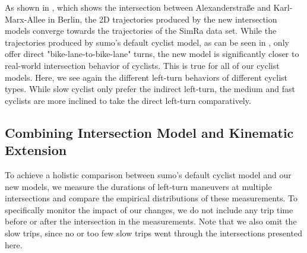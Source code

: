 As shown in , which shows the intersection between Alexanderstraße and Karl-Marx-Allee in Berlin, the 2D trajectories produced by the new intersection models converge towards the trajectories of the SimRa data set.
While the trajectories produced by \ac{sumo}'s default cyclist model, as can be seen in , only offer direct "bike-lane-to-bike-lane" turns, the new model is significantly closer to real-world intersection behavior of cyclists.
This is true for all of our cyclist models.
Here, we see again the different left-turn behaviors of different cyclist types.
While slow cyclist only prefer the indirect left-turn, the medium and fast cyclists are more inclined to take the direct left-turn comparatively.

\subsection{Combining Intersection Model and Kinematic Extension}
\label{subsec:combinin_intersection_model_and_kinematic_extension}
To achieve a holistic comparison between \ac{sumo}'s default cyclist model and our new models, we measure the durations of left-turn maneuvers at multiple intersections and compare the empirical distributions of these measurements.
To specifically monitor the impact of our changes, we do not include any trip time before or after the intersection in the measurements.
Note that we also omit the slow trips, since no or too few slow trips went through the intersections presented here.


